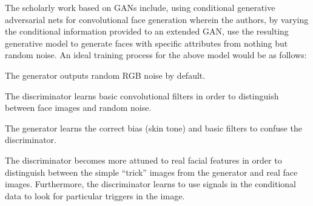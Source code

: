 \documentclass[conference]{IEEEtran}
\begin{document}
The scholarly work based on GANs include, using conditional generative adversarial nets for convolutional face generation wherein the authors, by varying the conditional information provided to an
extended GAN, use the resulting generative model
to generate faces with specific attributes from nothing but
random noise. 
An ideal training process for the above model would be
as follows: \begin{list}{*}{spacing}
	\item The generator outputs random RGB noise by default.
	\item The discriminator learns basic convolutional filters in
	order to distinguish between face images and random
	noise.
	\item The generator learns the correct bias (skin tone) and
	basic filters to confuse the discriminator.
	\item  The discriminator becomes more attuned to real facial
	features in order to distinguish between the simple
	“trick” images from the generator and real face images.
	Furthermore, the discriminator learns to use signals in
	the conditional data to look for particular triggers in
	the image.
\end{list} 
\end{document}
